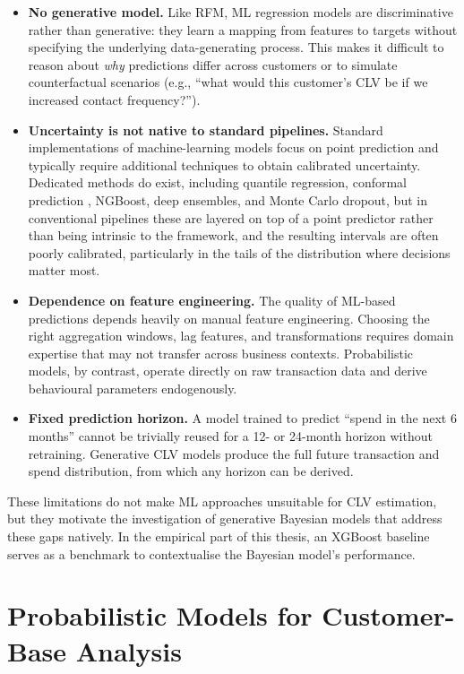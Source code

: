 \documentclass[12pt, a4paper, oneside]{report}
\begin{document}
\begin{itemize}
  \item \textbf{No generative model.} Like RFM, ML regression models are discriminative rather than generative: they learn a mapping from features to targets without specifying the underlying data-generating process. This makes it difficult to reason about \emph{why} predictions differ across customers or to simulate counterfactual scenarios (e.g., ``what would this customer's CLV be if we increased contact frequency?'').
  \item \textbf{Uncertainty is not native to standard pipelines.} Standard implementations of machine-learning models focus on point prediction and typically require additional techniques to obtain calibrated uncertainty. Dedicated methods do exist, including quantile regression, conformal prediction \parencite{angelopoulos2023}, NGBoost, deep ensembles, and Monte Carlo dropout, but in conventional pipelines these are layered on top of a point predictor rather than being intrinsic to the framework, and the resulting intervals are often poorly calibrated, particularly in the tails of the distribution where decisions matter most.
  \item \textbf{Dependence on feature engineering.} The quality of ML-based predictions depends heavily on manual feature engineering. Choosing the right aggregation windows, lag features, and transformations requires domain expertise that may not transfer across business contexts. Probabilistic models, by contrast, operate directly on raw transaction data and derive behavioural parameters endogenously.
  \item \textbf{Fixed prediction horizon.} A model trained to predict ``spend in the next 6 months'' cannot be trivially reused for a 12- or 24-month horizon without retraining. Generative CLV models produce the full future transaction and spend distribution, from which any horizon can be derived.
\end{itemize}

These limitations do not make ML approaches unsuitable for CLV estimation, but they motivate the investigation of generative Bayesian models that address these gaps natively. In the empirical part of this thesis, an XGBoost baseline serves as a benchmark to contextualise the Bayesian model's performance.

\section{Probabilistic Models for Customer-Base Analysis}
\label{sec:btyd-review}
\end{document}
